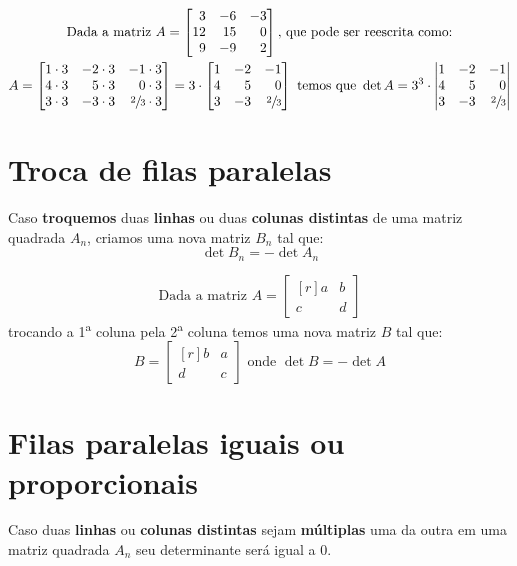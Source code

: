 \begin{gather*}
    \text{Dada a matriz }A=
    \begin{bmatrix*}[r]
        3 & -6 & -3\\
        12 & 15 & 0\\
        9 & -9 & 2
    \end{bmatrix*} 
    \text{, que pode ser reescrita como:}\\
    A=\begin{bmatrix*}[r]
        1\cdot3 & -2\cdot3 & -1\cdot3\\
        4\cdot3 & 5\cdot3 & 0\cdot3\\
        3\cdot3 & -3\cdot3 & \sfrac{2}{3}\cdot3
    \end{bmatrix*}
    =3\cdot \begin{bmatrix*}[r]
    1 & -2 & -1\\
    4 & 5 & 0\\
    3 & -3 & \sfrac{2}{3}
    \end{bmatrix*} 
    \text{ temos que } 
    \det A= 3^3 \cdot \begin{vmatrix*}[r]
    1 & -2 & -1\\
    4 & 5 & 0\\
    3 & -3 & \sfrac{2}{3}
    \end{vmatrix*}
\end{gather*}

\section{Troca de filas paralelas}
Caso \textbf{troquemos} duas \textbf{linhas} ou duas \textbf{colunas distintas} de uma matriz quadrada $A_n$, criamos uma nova matriz $B_n$ tal que: $$\det B_n=-\det A_n$$
\Example

$$
\text{Dada a matriz }A=\begin{bmatrix*}[r]
    a & b \\
    c & d
\end{bmatrix*}
$$
trocando a 1\textsuperscript{a} coluna pela 2\textsuperscript{a} coluna temos uma nova matriz $B$ tal que:
$$
B=\begin{bmatrix*}[r]
    b & a\\
    d & c
\end{bmatrix*} \text{ onde }\det B =-\det A
$$

\section{Filas paralelas iguais ou proporcionais}
Caso duas \textbf{linhas} ou \textbf{colunas distintas} sejam \textbf{múltiplas} uma da outra em uma matriz quadrada $A_n$ seu determinante será igual a $0$.

